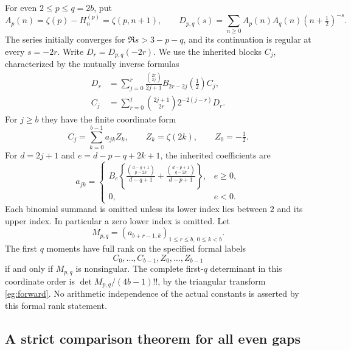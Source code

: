 \documentclass[11pt]{article}
\theoremstyle{definition}
\theoremstyle{remark}
\numberwithin{equation}{section}
\begin{document}
For even $2\le p\le q=2b$, put
\[
 A_p(n)=\zeta(p)-H_n^{(p)}=\zeta(p,n+1),\qquad
 D_{p,q}(s)=\sum_{n\ge0}A_p(n)A_q(n)(n+\tfrac12)^{-s}.
\]
The series initially converges for $\Re s>3-p-q$, and its continuation
is regular at every $s=-2r$. Write $D_r=D_{p,q}(-2r)$. We use the
inherited blocks $C_j$, characterized by the mutually inverse formulas
\begin{align}
 D_r&=\sum_{j=0}^r\frac{\binom{2r}{2j}}{2j+1}
       B_{2r-2j}(\tfrac12)C_j,\label{eg:forward}\\
 C_j&=\sum_{r=0}^j\binom{2j+1}{2r}2^{-2(j-r)}D_r.
       \label{eg:backward}
\end{align}
For $j\ge b$ they have the finite coordinate form
\[
 C_j=\sum_{k=0}^{b-1}a_{jk}Z_k,\qquad
 Z_k=\zeta(2k),\qquad Z_0=-\tfrac12.
\]
For $d=2j+1$ and $e=d-p-q+2k+1$, the inherited coefficients are
\begin{equation}\label{eg:entries}
 a_{jk}=\begin{cases}
 B_e\left\{\displaystyle
 \frac{\binom{d-q+1}{p-2k}}{d-q+1}
 +\frac{\binom{d-p+1}{q-2k}}{d-p+1}\right\},&e\ge0,\\[6pt]
 0,&e<0.
 \end{cases}
\end{equation}
Each binomial summand is omitted unless its lower index lies between
$2$ and its upper index. In particular a zero lower index is omitted.
Let
\begin{equation}\label{eg:M}
 M_{p,q}=(a_{b+r-1,k})_{1\le r\le b,\ 0\le k<b}.
\end{equation}
The first $q$ moments have full rank on the specified formal labels
\[
 C_0,\ldots,C_{b-1},Z_0,\ldots,Z_{b-1}
\]
if and only if $M_{p,q}$ is nonsingular. The complete first-$q$
determinant in this coordinate order is
$\det M_{p,q}/(4b-1)!!$, by the triangular transform
\eqref{eg:forward}. No arithmetic independence of the actual constants
is asserted by this formal rank statement.

\subsection{A strict comparison theorem for all even gaps}
\end{document}
